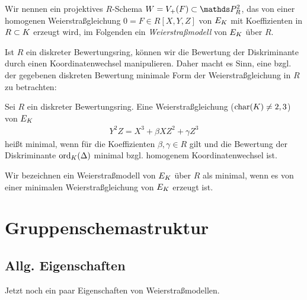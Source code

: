 \documentclass[german]{scrreprt}
\begin{document}
\begin{Definition}[Weierstraßmodell]
  Wir nennen ein projektives $R$-Schema $W=V_+(F)\subset\P_R^2$, das
  von einer homogenen Weierstraßgleichung $0=F\in R[X,Y,Z]$ von $E_{K}$
  mit Koeffizienten in $R\subset K$ erzeugt wird, im Folgenden
  ein \emph{Weierstraßmodell} von $E_{K}$ über $R$.
\end{Definition}

Ist $R$ ein diskreter Bewertungsring, können wir die Bewertung der
Diskriminante durch einen Koordinatenwechsel manipulieren. Daher macht
es Sinn, eine bzgl. der gegebenen diskreten Bewertung minimale
Form der Weierstraßgleichung in $R$ zu betrachten:
\begin{Definition}
  Sei $R$ ein diskreter Bewertungsring.
  Eine Weierstraßgleichung ($\operatorname{char}(K)\neq2,3$) von $E_{K}$
  \begin{gather*}
    Y^2Z = X^3 + \beta XZ^2 + \gamma Z^3
  \end{gather*}
  heißt minimal, wenn für die Koeffizienten $\beta, \gamma\in R$ gilt
  und die Bewertung der Diskriminante $\operatorname{ord}_{K}(\Delta)$ minimal
  bzgl. homogenem Koordinatenwechsel ist.

  Wir bezeichnen ein Weierstraßmodell von $E_{K}$ über $R$ als minimal,
  wenn es von einer minimalen Weierstraßgleichung von $E_{K}$ erzeugt
  ist.
\end{Definition}


\section{Gruppenschemastruktur}
\subsection{Allg. Eigenschaften}
Jetzt noch ein paar Eigenschaften von Weierstraßmodellen.
\end{document}
